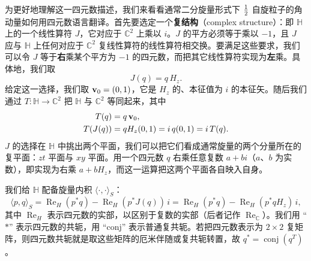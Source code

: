 为更好地理解这一四元数描述，我们来看看通常二分旋量形式下 $\tfrac{1}{2}$ 自旋粒子的角动量如何用四元数语言翻译。首先要选定一个\textbf{复结构}（complex structure）：即 $\mathbb{H}$ 上的一个线性算符 $J$，它对应于 $\mathbb{C}^{2}$ 上乘以 $i$。$J$ 的平方必须等于乘以 $-1$，且 $J$ 应与 $\mathbb{H}$ 上任何对应于 $\mathbb{C}^{2}$ 复线性算符的线性算符相交换。要满足这些要求，我们可以令 $J$ 等于\textbf{右}乘某个平方为 $-1$ 的四元数，而把其它线性算符实现为\textbf{左}乘。具体地，我们取
\begin{equation}
J(q)=q\,H_{z}.
\end{equation}
给定这一选择，我们取 $\mathbf{v}_{0}=(0,1)$，它是 $H_{z}$ 的、本征值为 $i$ 的本征矢。随后我们通过 $T:\mathbb{H}\to\mathbb{C}^{2}$ 把 $\mathbb{H}$ 与 $\mathbb{C}^{2}$ 等同起来，其中
\begin{align*}
T(q) &= q\,\mathbf{v}_{0},\\
T(J(q)) &= qH_{z}(0,1)=i\,q(0,1)=i\,T(q).
\end{align*}
$J$ 的选择在 $\mathbb{H}$ 中挑出两个平面，我们可以把它们看成通常旋量的两个分量所在的复平面：$zt$ 平面与 $xy$ 平面。用一个四元数 $q$ 右乘任意复数 $a+bi$（$a$、$b$ 为实数），即实现为右乘 $a+bH_{z}$，而这一运算把这两个平面各自映入自身。

我们给 $\mathbb{H}$ 配备旋量内积 $\langle\cdot,\cdot\rangle_{S}$：
\begin{equation}
\langle p,q\rangle_{S}=\operatorname{Re}_{H}(p^{*}q)-\operatorname{Re}_{H}(p^{*}J(q))\,i
=\operatorname{Re}_{H}(p^{*}q)-\operatorname{Re}_{H}(p^{*}qH_{z})\,i,
\end{equation}
其中 $\operatorname{Re}_{H}$ 表示四元数的实部，以区别于复数的实部（后者记作 $\operatorname{Re}_{\mathbb{C}}$）。我们用 “$*$” 表示四元数的共轭，用 “conj” 表示普通复共轭。若把四元数表示为 $2\times2$ 复矩阵，则四元数共轭就是取这些矩阵的厄米伴随或复共轭转置，故 $q^{*}=\operatorname{conj}(q^{T})$。

